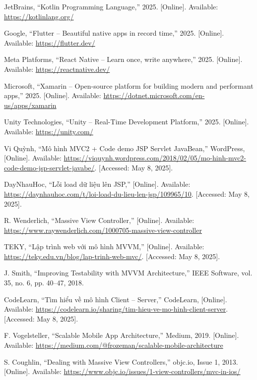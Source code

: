 \documentclass[12pt]{report}
\begin{document}
\begin{thebibliography}{1}
  JetBrains, ``Kotlin Programming Language,'' 2025. [Online]. Available: \url{https://kotlinlang.org/}

  Google, ``Flutter – Beautiful native apps in record time,'' 2025. [Online]. Available: \url{https://flutter.dev/}

  Meta Platforms, ``React Native – Learn once, write anywhere,'' 2025. [Online]. Available: \url{https://reactnative.dev/}

  Microsoft, ``Xamarin – Open-source platform for building modern and performant apps,'' 2025. [Online]. Available: \url{https://dotnet.microsoft.com/en-us/apps/xamarin}

  Unity Technologies, ``Unity – Real-Time Development Platform,'' 2025. [Online]. Available: \url{https://unity.com/}

  Vi Quỳnh, “Mô hình MVC2 + Code demo JSP Servlet JavaBean,” WordPress, [Online]. Available: \url{https://viquynh.wordpress.com/2018/02/05/mo-hinh-mvc2-code-demo-jsp-servlet-javabe/}. [Accessed: May 8, 2025].

  DayNhauHoc, “Lỗi load dữ liệu lên JSP,” [Online]. Available: \url{https://daynhauhoc.com/t/loi-load-du-lieu-len-jsp/109965/10}. [Accessed: May 8, 2025].


  R. Wenderlich, ``Massive View Controller,'' [Online]. Available: \url{https://www.raywenderlich.com/1000705-massive-view-controller}

  TEKY, “Lập trình web với mô hình MVVM,” [Online]. Available: \url{https://teky.edu.vn/blog/lap-trinh-web-mvc/}. [Accessed: May 8, 2025].



  J. Smith, ``Improving Testability with MVVM Architecture,'' IEEE Software, vol. 35, no. 6, pp. 40–47, 2018.

  CodeLearn, “Tìm hiểu về mô hình Client – Server,” CodeLearn, [Online]. Available: \url{https://codelearn.io/sharing/tim-hieu-ve-mo-hinh-client-server}. [Accessed: May 8, 2025].


  F. Vogelsteller, ``Scalable Mobile App Architecture,'' Medium, 2019. [Online]. Available: \url{https://medium.com/@frozeman/scalable-mobile-architecture}

  S. Coughlin, ``Dealing with Massive View Controllers,'' objc.io, Issue 1, 2013. [Online]. Available: \url{https://www.objc.io/issues/1-view-controllers/mvc-in-ios/}
  

\end{thebibliography}
\end{document}

